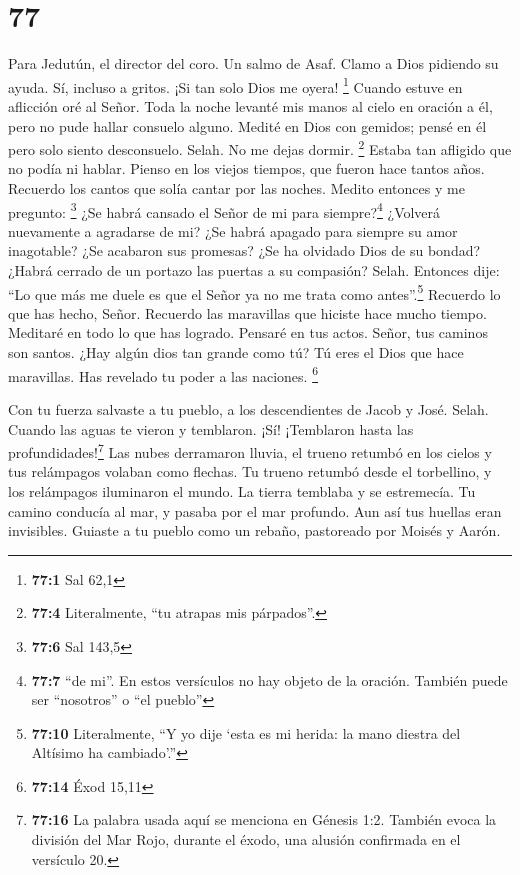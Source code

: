\hypertarget{section-76}{%
\section{77}\label{section-76}}

Para Jedutún, el director del coro. Un salmo de Asaf. 
Clamo a Dios pidiendo su ayuda. Sí, incluso a gritos. ¡Si tan solo Dios
me oyera! \footnote{\textbf{77:1} Sal 62,1}  Cuando estuve
en aflicción oré al Señor. Toda la noche levanté mis manos al cielo en
oración a él, pero no pude hallar consuelo alguno.  Medité
en Dios con gemidos; pensé en él pero solo siento desconsuelo. Selah.
 No me dejas dormir. \footnote{\textbf{77:4} Literalmente,
  ``tu atrapas mis párpados''.} Estaba tan afligido que no podía ni
hablar.  Pienso en los viejos tiempos, que fueron hace
tantos años.  Recuerdo los cantos que solía cantar por las
noches. Medito entonces y me pregunto: \footnote{\textbf{77:6} Sal 143,5}
 ¿Se habrá cansado el Señor de mi para siempre?\footnote{\textbf{77:7}
  ``de mi''. En estos versículos no hay objeto de la oración. También
  puede ser ``nosotros'' o ``el pueblo''} ¿Volverá nuevamente a
agradarse de mi?  ¿Se habrá apagado para siempre su amor
inagotable? ¿Se acabaron sus promesas?  ¿Se ha olvidado
Dios de su bondad? ¿Habrá cerrado de un portazo las puertas a su
compasión? Selah.  Entonces dije: ``Lo que más me duele
es que el Señor ya no me trata como antes''.\footnote{\textbf{77:10}
  Literalmente, ``Y yo dije `esta es mi herida: la mano diestra del
  Altísimo ha cambiado'.''}  Recuerdo lo que has hecho,
Señor. Recuerdo las maravillas que hiciste hace mucho tiempo.
 Meditaré en todo lo que has logrado. Pensaré en tus
actos.  Señor, tus caminos son santos. ¿Hay algún dios
tan grande como tú?  Tú eres el Dios que hace maravillas.
Has revelado tu poder a las naciones. \footnote{\textbf{77:14} Éxod
  15,11}

 Con tu fuerza salvaste a tu pueblo, a los descendientes
de Jacob y José. Selah.  Cuando las aguas te vieron y
temblaron. ¡Sí! ¡Temblaron hasta las profundidades!\footnote{\textbf{77:16}
  La palabra usada aquí se menciona en Génesis 1:2. También evoca la
  división del Mar Rojo, durante el éxodo, una alusión confirmada en el
  versículo 20.}  Las nubes derramaron lluvia, el trueno
retumbó en los cielos y tus relámpagos volaban como flechas.
 Tu trueno retumbó desde el torbellino, y los relámpagos
iluminaron el mundo. La tierra temblaba y se estremecía. 
Tu camino conducía al mar, y pasaba por el mar profundo. Aun así tus
huellas eran invisibles.  Guiaste a tu pueblo como un
rebaño, pastoreado por Moisés y Aarón.

